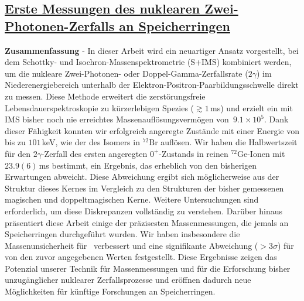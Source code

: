 
\subsection*{\normalsize \underline{Erste Messungen des nuklearen Zwei-Photonen-Zerfalls an Speicherringen}}
\textbf{Zusammenfassung} - In dieser Arbeit wird ein neuartiger Ansatz vorgestellt, bei dem Schottky- und Isochron-Massenspektrometrie (S+IMS) kombiniert werden, um die nukleare Zwei-Photonen- oder Doppel-Gamma-Zerfallsrate ($2\gamma$) im Niederenergiebereich unterhalb der Elektron-Positron-Paarbildungsschwelle direkt zu messen. Diese Methode erweitert die zerstörungsfreie Lebensdauerspektroskopie zu kürzerlebigen Spezies ($\gtrsim 1$\,ms) und erzielt ein mit IMS bisher noch nie erreichtes Massenauflösungsvermögen von \,$9.1\times10^5$. Dank dieser Fähigkeit konnten wir erfolgreich angeregte Zustände mit einer Energie von bis zu $101$\,keV, wie der des Isomers in $^{72}\mathrm{Br}$ auflösen.
Wir haben die Halbwertszeit für den $2\gamma$-Zerfall des ersten angeregten $0^+$-Zustands in reinen $^{72}\mathrm{Ge}$-Ionen mit $23.9\left(6\right)$\,ms bestimmt, ein Ergebnis, das erheblich von den bisherigen Erwartungen abweicht. Diese Abweichung ergibt sich möglicherweise aus der Struktur dieses Kernes im Vergleich zu den Strukturen der bisher gemessenen magischen und doppeltmagischen Kerne. Weitere Untersuchungen sind erforderlich, um diese Diskrepanzen vollständig zu verstehen.
\newpar
Darüber hinaus präsentiert diese Arbeit einige der präzisesten Massenmessungen, die jemals an Speicherringen durchgeführt wurden. Wir haben insbesondere die Massenunsicherheit für \, verbessert und eine signifikante Abweichung ($>3\sigma$) für \, von den zuvor angegebenen Werten festgestellt. 
\newpar
Diese Ergebnisse zeigen das Potenzial unserer Technik für Massenmessungen und für die Erforschung bisher unzugänglicher nuklearer Zerfallsprozesse und eröffnen dadurch neue Möglichkeiten für künftige Forschungen an Speicherringen.
